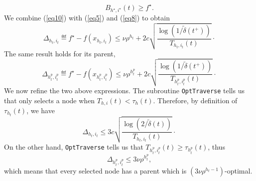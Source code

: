 \begin{equation} \label{eq10}
B_{h^\star,i^\star}(t) \geq f^\star.
\end{equation}
We combine (\ref{eq10}) with (\ref{eq5}) and (\ref{eq8}) to obtain
\begin{equation*} %
\Delta_{h_t,i_t} \eqdef f^\star - f(x_{h_t,i_t}) \leq \nu\rho^{h_t} + 2c\sqrt{\frac{\operatorname{log}(1/\tilde{\delta}(t^+))}{T_{h_t,i_t}(t)}}\cdot
\end{equation*}
The same result holds for its parent,
\begin{equation*} %
\Delta_{h_t^p,i_t^p} \eqdef f^\star - f(x_{h_t^p,i_t^p}) \leq \nu\rho^{h_t^p} + 2c\sqrt{\frac{\operatorname{log}(1/\tilde{\delta}(t^+))}{T_{h_t^p,i_t^p}(t)}}\cdot
\end{equation*}
We now refine the two above expressions. The subroutine \texttt{OptTraverse} tells us that \HCT only selects a node when $T_{h,i}(t)<\tau_h(t)$. Therefore, by definition of $\tau_{h_t}(t)$, we have
\begin{equation} \label{eq13}
\Delta_{h_t,i_t} \leq 3c\sqrt{\frac{\operatorname{log}(2/\tilde{\delta}(t))}{T_{h_t,i_t}(t)}}\cdot
\end{equation}
On the other hand,  \texttt{OptTraverse} tells us that $T_{h_t^p,i_t^p}(t)\geq\tau_{h_t^p}(t)$, thus
\begin{equation*} %
\Delta_{h_t^p,i_t^p} \leq 3\nu\rho^{h_t^p},
\end{equation*}
which means that every selected node has a parent which is $(3\nu\rho^{h_t-1})$-optimal.


